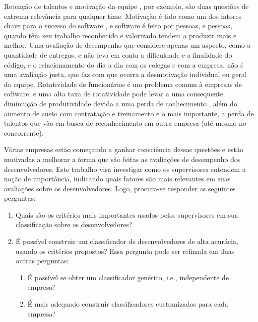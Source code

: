Retenção de talentos \cite{Boehm2000, Chatzoglou1997, DeMarco1987, Guzzo1988, Scudder1991, Wohlin1995, Wohlin2001} e motivação da equipe \cite{Boehm1987, DeMarco1987, Boehm1984, Jones2000, Sharp2009, Boehm1982, Boehm1988, Hantos2000}, por exemplo, são duas questões de extrema relevância para qualquer time. Motivação é tido como um dos fatores chave para o sucesso do software \cite{Sharp2009}, e software é feito por pessoas, e pessoas, quando têm seu trabalho reconhecido e valorizado tendem a produzir mais e melhor. Uma avaliação de desempenho que considere apenas um aspecto, como a quantidade de entregas, e não leva em conta a dificuldade e a finalidade do código, e o relacionamento do dia a dia com os colegas e com a empresa, não é uma avaliação justa, que faz com que ocorra a desmotivação individual ou geral da equipe. Rotatividade de funcionários é um problema comum à empresas de software\cite{Abdel-Hamid1991, Wallace2004}, e uma alta taxa de rotatividade pode levar a uma consequente diminuição de produtividade devida a uma perda de conhecimento \cite{Melo2011, Coram2005}, além do aumento de custo com contratação e treinamento e o mais importante, a perda de talentos que vão em busca de reconhecimento em outra empresa (até mesmo no concorrente).

Várias empresas estão começando a ganhar consciência dessas questões e estão motivadas a melhorar a forma que são feitas as avaliações de desempenho dos desenvolvedores. Este trabalho visa investigar como os supervisores entendem a noção de importância, indicando quais fatores são mais relevantes em suas avaliações sobre os desenvolvedores. Logo, procura-se responder as seguintes perguntas:

\begin{enumerate}
	\item Quais são os critérios mais importantes usados pelos supervisores em sua classificação sobre os desenvolvedores?
	\item É possível construir um classificador de desenvolvedores de alta acurácia, usando os critérios propostos? Essa pergunta pode ser refinada em duas outras perguntas:
	\begin{enumerate}
		\item É possível se obter um classificador genérico, i.e., independente de empresa?
		\item É mais adequado construir classificadores customizados para cada empresa?
	\end{enumerate}
\end{enumerate}



